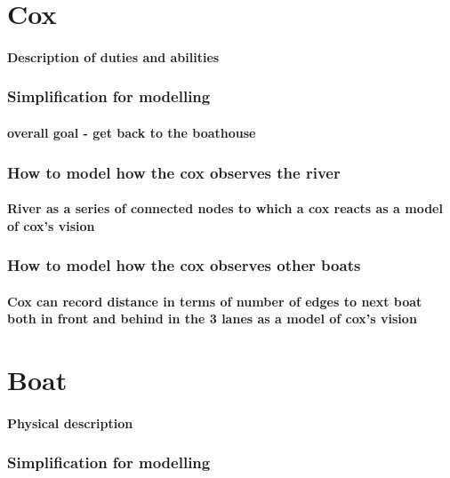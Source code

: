       
        
    
    
    \section{Cox}
      \paragraph{Description of duties and abilities}
      \subsubsection{Simplification for modelling}
        \paragraph{overall goal - get back to the boathouse}
      \subsubsection{How to model how the cox observes the river}
        \paragraph{River as a series of connected nodes to which a cox reacts as a model of cox's vision}
      \subsubsection{How to model how the cox observes other boats}
        \paragraph{Cox can record distance in terms of number of edges to next boat both in front and behind in the 3 lanes as a model of cox's vision}
        
    \section{Boat}
      \paragraph{Physical description}
      \subsubsection{Simplification for modelling}
